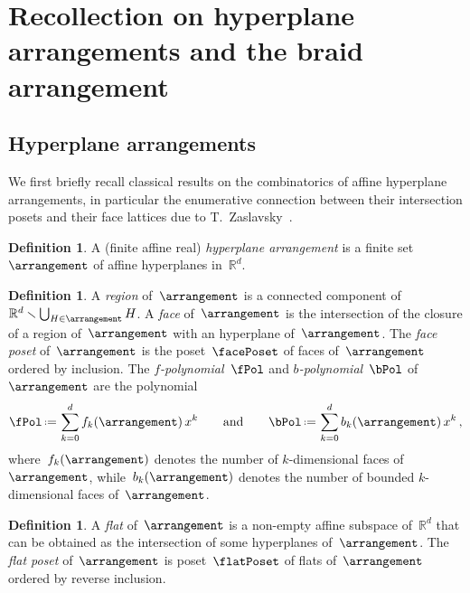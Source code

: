 \documentclass{amsart}
\newcommand{\darkblue}{\color{darkblue}} %
\theoremstyle{definition}
\newtheorem{definition}[theorem]{Definition}
\newcommand{\R}{\mathbb{R}} %
\newcommand{\ssm}{\smallsetminus} %
\newcommand{\eqdef}{\mbox{\,\raisebox{0.2ex}{\scriptsize\ensuremath{\mathrm:}}\ensuremath{=}\,}} %
\newcommand{\defn}[1]{\textsl{\darkblue #1}} %
\begin{document}

\section{Recollection on hyperplane arrangements and the braid arrangement}
\label{sec:arrangements}


\subsection{Hyperplane arrangements}
\label{subsec:arrangements}

We first briefly recall classical results on the combinatorics of affine hyperplane arrangements, in particular the enumerative connection between their intersection posets and their face lattices due to T.~Zaslavsky~\cite{Zaslavsky}.

\begin{definition}
A (finite affine real) \defn{hyperplane arrangement} is a finite set~$\arrangement$ of affine hyperplanes in~$\R^d$.
\end{definition}

\begin{definition}
A \defn{region} of~$\arrangement$ is a connected component of~$\R^d \ssm \bigcup_{H \in \arrangement} H$.
A \defn{face} of~$\arrangement$ is the intersection of the closure of a region of~$\arrangement$ with an hyperplane of~$\arrangement$.
The \defn{face poset} of~$\arrangement$ is the poset~$\facePoset$ of faces of~$\arrangement$ ordered by inclusion.
The \defn{$f$-polynomial}~$\fPol$ and \defn{$b$-polynomial}~$\bPol$ of~$\arrangement$ are the polynomial
\[
\fPol \eqdef \sum_{k = 0}^d f_k(\arrangement) \, x^k
\qquad\text{and}\qquad
\bPol \eqdef \sum_{k = 0}^d b_k(\arrangement) \, x^k \, ,
\]
where~$f_k(\arrangement)$ denotes the number of $k$-dimensional faces of~$\arrangement$, while~$b_k(\arrangement)$ denotes the number of bounded $k$-dimensional faces of~$\arrangement$.
\end{definition}

\begin{definition}
A \defn{flat} of~$\arrangement$ is a non-empty affine subspace of~$\R^d$ that can be obtained as the intersection of some hyperplanes of~$\arrangement$.
The \defn{flat poset} of~$\arrangement$ is poset~$\flatPoset$ of flats of~$\arrangement$ ordered by reverse inclusion.
\end{definition}
\end{document}

